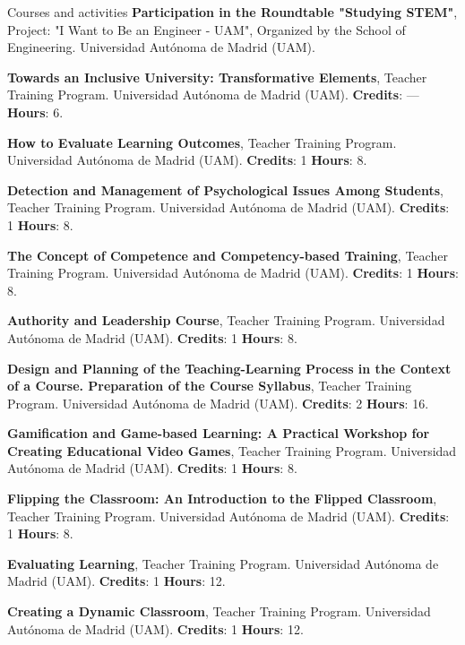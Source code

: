 \begin{rubric}{Courses and activities}
\entry*[June 2022] \textbf{Participation in the Roundtable "Studying STEM"}, Project: "I Want to Be an Engineer - UAM", Organized by the School of Engineering. Universidad Autónoma de Madrid (UAM).


 \entry*[May 9–11, 2022] \textbf{Towards an Inclusive University: Transformative Elements}, Teacher Training Program. Universidad Autónoma de Madrid (UAM). \textbf{Credits}: — \textbf{Hours}: 6.
 
 \entry*[February 15–17, 2023] \textbf{How to Evaluate Learning Outcomes}, Teacher Training Program. Universidad Autónoma de Madrid (UAM). \textbf{Credits}: 1 \textbf{Hours}: 8.
 
 \entry*[April 20–27, 2023] \textbf{Detection and Management of Psychological Issues Among Students}, Teacher Training Program. Universidad Autónoma de Madrid (UAM). \textbf{Credits}: 1 \textbf{Hours}: 8.
 
 \entry*[October 17–24, 2023] \textbf{The Concept of Competence and Competency-based Training}, Teacher Training Program. Universidad Autónoma de Madrid (UAM). \textbf{Credits}: 1 \textbf{Hours}: 8.
 
 \entry*[February 19–20, 2024] \textbf{Authority and Leadership Course}, Teacher Training Program. Universidad Autónoma de Madrid (UAM). \textbf{Credits}: 1 \textbf{Hours}: 8.
 
  \textbf{Design and Planning of the Teaching-Learning Process in the Context of a Course. Preparation of the Course Syllabus}, Teacher Training Program. Universidad Autónoma de Madrid (UAM). \textbf{Credits}: 2 \textbf{Hours}: 16.
 
 \entry*[October 18–25, 2024] \textbf{Gamification and Game-based Learning: A Practical Workshop for Creating Educational Video Games}, Teacher Training Program. Universidad Autónoma de Madrid (UAM). \textbf{Credits}: 1 \textbf{Hours}: 8.
 
 \entry*[October 10–23, 2024] \textbf{Flipping the Classroom: An Introduction to the Flipped Classroom}, Teacher Training Program. Universidad Autónoma de Madrid (UAM). \textbf{Credits}: 1 \textbf{Hours}: 8.
 
 \entry*[May 26–29, 2025] \textbf{Evaluating Learning}, Teacher Training Program. Universidad Autónoma de Madrid (UAM). \textbf{Credits}: 1 \textbf{Hours}: 12.
 
  \textbf{Creating a Dynamic Classroom}, Teacher Training Program. Universidad Autónoma de Madrid (UAM). \textbf{Credits}: 1 \textbf{Hours}: 12.
 

\end{rubric}
